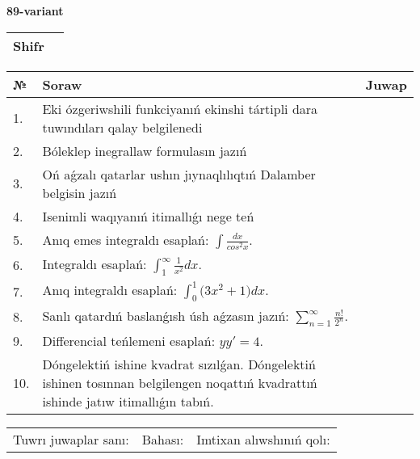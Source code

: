\documentclass{article}
\begin{document}
  \egroup
  
  \newpage
  
  
  \textbf{89-variant}\\
  
  \bgroup
  \def\arraystretch{1.6} %
  
  \begin{tabular}{|m{5.7cm}|m{9.5cm}|}
  \hline
  Shifr & \\
  \hline
  \end{tabular}
  
  \vspace{1cm}
  
  \begin{tabular}{|m{0.7cm}|m{10cm}|m{4cm}|}
  \hline
  № & Soraw & Juwap \\
  \hline
  1. & Eki ózgeriwshili funkciyanıń ekinshi tártipli dara tuwındıları qalay belgilenedi &  \\
  \hline
  2. & Bóleklep inegrallaw formulasın jazıń &  \\
  \hline
  3. & Oń aǵzalı qatarlar ushın jıynaqlılıqtıń Dalamber belgisin jazıń &  \\
  \hline
  4. & Isenimli waqıyanıń itimallıǵı nege teń &  \\
  \hline
  5. & Anıq emes integraldı esaplań: \(\int\frac{dx}{cos^2 x}\). &  \\
  \hline
  6. & Integraldı esaplań: \(\int_{1}^{\infty}{\frac{1}{x^2 }dx}\). &  \\
  \hline
  7. & Anıq integraldı esaplań: \(\int_{0}^{1}{(3x^2 } + 1)dx\). &  \\
  \hline
  8. & Sanlı qatardıń baslanǵısh úsh aǵzasın jazıń: \(\sum_{n = 1}^{\infty}\frac{n!}{2^{n}}\). &  \\
  \hline
  9. & Differencial teńlemeni esaplań: \(yy' = 4\). &  \\
  \hline
  10. & Dóngelektiń ishine kvadrat sızılǵan. Dóngelektiń ishinen tosınnan belgilengen noqattıń kvadrattıń ishinde jatıw itimallıǵın tabıń. &  \\
  \hline
  \end{tabular}
  
  \vspace{1cm}
  
  \begin{tabular}{lll}
  Tuwrı juwaplar sanı: \underline{\hspace{1.5cm}} & 
  Bahası: \underline{\hspace{1.5cm}} & 
  Imtixan alıwshınıń qolı: \underline{\hspace{2cm}} \\
  \end{tabular}
  
\end{document}

